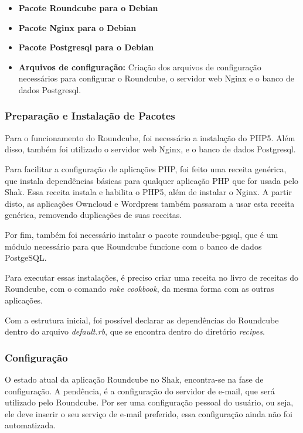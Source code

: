 \begin{itemize}
   \item \textbf{Pacote Roundcube para o Debian}
   \item \textbf{Pacote Nginx para o Debian}
   \item \textbf{Pacote Postgresql para o Debian}
   \item \textbf{Arquivos de configuração:} Criação dos arquivos de configuração
   necessários para configurar o Roundcube, o servidor web Nginx e o banco de dados
   Postgresql.
\end{itemize}

\subsubsection{Preparação e Instalação de Pacotes}

Para o funcionamento do Roundcube, foi necessário a instalação do PHP5. Além
disso, também foi utilizado o servidor web Nginx, e o 
banco de dados Postgresql.

Para facilitar a configuração de aplicações PHP, foi feito uma receita genérica,
que instala dependências básicas para qualquer aplicação PHP que for usada pelo
Shak. Essa receita instala e habilita o PHP5, além de instalar o Nginx. A partir
disto, as aplicações Owncloud e Wordpress também passaram a usar esta receita
genérica, removendo duplicações de suas receitas.

Por fim, também foi necessário instalar o pacote roundcube-pgsql, que é um módulo 
necessário para que Roundcube funcione com o banco de dados PostgeSQL.
 
Para executar essas instalações, é preciso criar uma receita no livro de receitas
do Roundcube, com o comando \textit{rake cookbook}, da mesma forma com as outras aplicações.
 
Com a estrutura inicial, foi possível declarar as dependências do Roundcube
dentro do arquivo \textit{default.rb}, que se encontra dentro do diretório 
\textit{recipes}. 

\subsubsection{Configuração}

O estado atual da aplicação Roundcube no Shak, encontra-se na fase de configuração. A pendência,
é a configuração do servidor de e-mail, que será utilizado pelo Roundcube. Por ser
uma configuração pessoal do usuário, ou seja, ele deve inserir o seu serviço
de e-mail preferido, essa configuração ainda não foi automatizada. 


